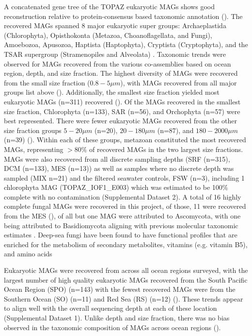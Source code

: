 \documentclass[12pt]{article}
\numberwithin{equation}{section}
\begin{document}
A concatenated gene tree of the TOPAZ eukaryotic MAGs shows good reconstruction relative to protein-consensus based taxonomic annotation (). The recovered MAGs spanned 8 major eukaryotic super groups: Archaeplastida (Chlorophyta), Opisthokonta (Metazoa, Choanoflagellata, and Fungi), Amoebozoa, Apusozoa, Haptista (Haptophyta), Cryptista (Cryptophyta), and the TSAR supergroup (Stramenopiles and Alveolata) \citep{Burki_2020}. Taxonomic trends were observed for MAGs recovered from the various co-assemblies based on ocean region, depth, and size fraction. The highest diversity of MAGs were recovered from the small size fraction ($0.8-5 \mu m$), with MAGs recovered from all major groups list above (). Additionally, the smallest size fraction yielded most eukaryotic MAGs (n=311) recovered (). Of the MAGs recovered in the smallest size fraction,  Chlorophyta (n=133), SAR (n=56), and Orchophyta (n=57) were best represented. There were fewer eukaryotic MAGs recovered from the other size fraction groups $5-20\mu m$ (n=20), $20-180 \mu m$ (n=87), and $180-2000\mu m$ (n=39) (). Within each of these groups, metazoan constituted the most recovered MAGs, representing $>80\%$ of recovered MAGs in the two largest size fractions. MAGs were also recovered from all discrete sampling depths (SRF (n=315), DCM (n=133), MES (n=13)) as well as samples where no discrete depth was sampled (MIX n=21) and the filtered seawater controls, FSW (n=3), including 1 chlorophyta MAG (TOPAZ\_IOF1\_E003) which was estimated to be 100\% complete with no contamination (Supplemental Dataset 2). A total of 16 highly complete fungal MAGs were recovered in this project, of those, 11 were recovered from the MES (), of all but one MAG were attributed to Ascomycota, with one being attributed to Basidiomycota aligning with previous molecular taxonomic estimates \citep{Morales_2019,Pernice_2015,Edgcomb_2010}. Deep-sea fungi have been found to have functional profiles that are enriched for the metabolism of secondary metabolites, vitamins (e.g. vitamin B5), and amino acids \citep{Morales_2019,DAMARE2006172} 

Eukaryotic MAGs were recovered from across all ocean regions surveyed, with the largest number of high quality eukaryotic MAGs recovered from the South Pacific Ocean Region (SPO) (n=143) with the fewest recovered MAGs were from the Southern Ocean (SO) (n=11) and Red Sea (RS) (n=12) (). These trends appear to align well with the overall sequencing depth at each of these location (Supplemental Dataset 1). Unlike depth and size fraction, there was no bias observed in the taxonomic composition of MAGs across ocean regions (). 
\end{document}
